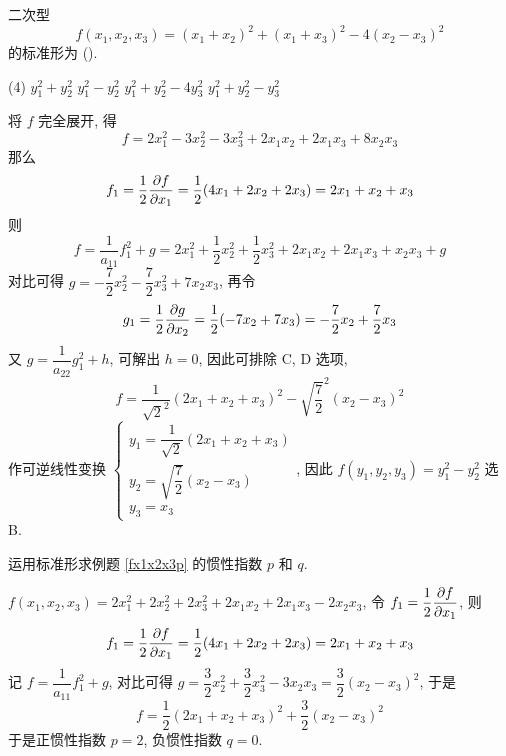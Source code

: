 \begin{example}
    二次型 $$f(x_1,x_2,x_3)=(x_1+x_2)^2+(x_1+x_3)^2-4(x_2-x_3)^2$$ 的标准形为 (\quad).
    \begin{tasks}(4)
        \task $y_1^2+y_2^2$
        \task $y_1^2-y_2^2$
        \task $y_1^2+y_2^2-4y_3^2$
        \task $y_1^2+y_2^2-y_3^2$
    \end{tasks}
\end{example}
\begin{solution}
    将 $f$ 完全展开, 得 $$f=2x_1^2-3x_2^2-3x_3^2+2x_1x_2+2x_1x_3+8x_2x_3$$
    那么 $$f_1=\dfrac{1}{2}\pdv{f}{x_1}=\dfrac{1}{2}(4x_1+2x_2+2x_3)=2x_1+x_2+x_3$$
    则 $$f=\dfrac{1}{a_{11}}f_1^2+g=2x_1^2+\dfrac{1}{2}x_2^2+\dfrac{1}{2}x_3^2+2x_1x_2+2x_1x_3+x_2x_3+g$$
    对比可得 $g=-\dfrac{7}{2}x_2^2-\dfrac{7}{2}x_3^2+7x_2x_3$, 
    再令 $$g_1=\dfrac{1}{2}\pdv{g}{x_2}=\dfrac{1}{2}(-7x_2+7x_3)=-\dfrac{7}{2}x_2+\dfrac{7}{2}x_3$$
    又 $g=\dfrac{1}{a_{22}}g_1^2+h$, 可解出 $h=0$, 因此可排除 C, D 选项, 
    $$f=\dfrac{1}{\sqrt{2}^2}(2x_1+x_2+x_3)^2-\sqrt{\dfrac{7}{2}}^2(x_2-x_3)^2$$
    作可逆线性变换 $\begin{cases}
            y_1=\dfrac{1}{\sqrt{2}} (2x_1+x_2+x_3) \\[6pt]
            y_2=\sqrt{\dfrac{7}{2} } (x_2-x_3)     \\[6pt]
            y_3=x_3
        \end{cases}$, 因此 $f(y_1,y_2,y_3)=y_1^2-y_2^2$ 选 B.
\end{solution}

\begin{example}
    运用标准形求例题 \ref{fx1x2x3p} 的惯性指数 $p$ 和 $q$.
\end{example}
\begin{solution}
    $f(x_1,x_2,x_3)=2x_1^2+2x_2^2+2x_3^2+2x_1x_2+2x_1x_3-2x_2x_3$, 令 $f_1=\dfrac{1}{2}\displaystyle\pdv{f}{x_1}$, 则 $$f_1=\dfrac{1}{2}\pdv{f}{x_1}=\dfrac{1}{2}(4x_1+2x_2+2x_3)=2x_1+x_2+x_3$$
    记 $f=\dfrac{1}{a_{11}}f_1^2+g$, 对比可得 $g=\dfrac{3}{2}x_2^2+\dfrac{3}{2}x_3^2-3x_2x_3=\dfrac{3}{2}(x_2-x_3)^2$, 于是 $$f=\dfrac{1}{2}(2x_1+x_2+x_3)^2+\dfrac{3}{2}(x_2-x_3)^2$$
    于是正惯性指数 $p=2$, 负惯性指数 $q=0.$
\end{solution}
